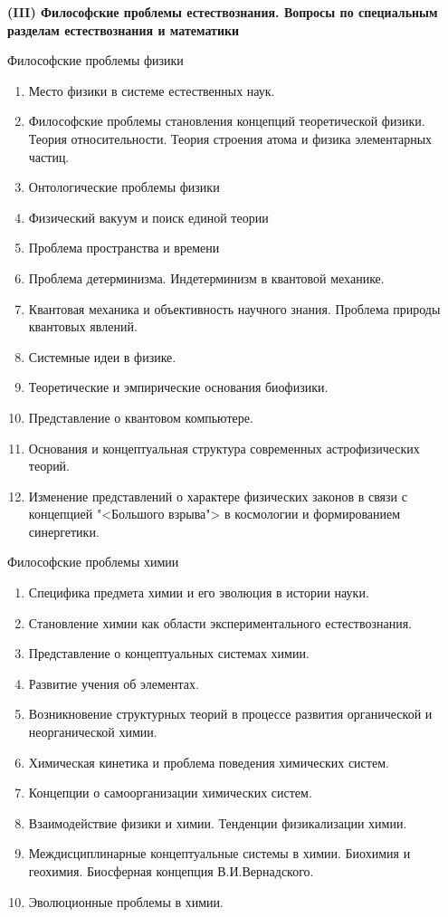\documentclass[main.tex]{subfiles}
\begin{document}
\vspace{12mm}
{\parindent0pt\textbf{(III) Философские проблемы естествознания. Вопросы по специальным разделам естествознания и математики}}

\vspace{4mm}
\centerline{Философские проблемы физики}
\begin{enumerate}[nosep,leftmargin=*]
	\item Место физики в системе естественных наук.
	\item Философские проблемы становления концепций теоретической физики. Теория относительности. Теория строения атома и физика элементарных частиц.
	\item Онтологические проблемы физики
	\item Физический вакуум и поиск единой теории
	\item Проблема пространства и времени
	\item Проблема детерминизма. Индетерминизм в квантовой механике.
	\item Квантовая механика и объективность научного знания. Проблема природы квантовых явлений.
	\item Системные идеи в физике.
	\item Теоретические и эмпирические основания биофизики.
	\item Представление о квантовом компьютере.
	\item Основания и концептуальная структура современных астрофизических теорий.
	\item Изменение представлений о характере физических законов в связи с концепцией "<Большого взрыва"> в космологии и формированием синергетики.	
\end{enumerate}

\vspace{4mm}
\centerline{Философские проблемы химии}
\begin{enumerate}[nosep,leftmargin=*]
	\item Специфика предмета химии и его эволюция в истории науки.
	\item Становление химии как области экспериментального естествознания.
	\item Представление о концептуальных системах химии.
	\item Развитие учения об элементах.
	\item Возникновение структурных теорий в процессе развития органической и неорганической химии.
	\item Химическая кинетика и проблема поведения химических систем.
	\item Концепции о самоорганизации химических систем.
	\item Взаимодействие физики и химии. Тенденции физикализации химии.
	\item Междисциплинарные концептуальные системы в химии. Биохимия и геохимия. Биосферная концепция В.И.Вернадского.
	\item Эволюционные проблемы в химии.
\end{enumerate}
\end{document}
